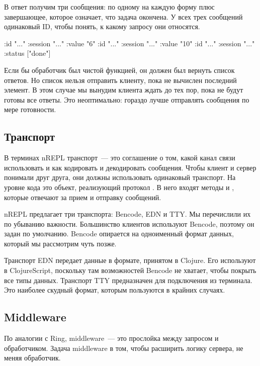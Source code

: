 В ответ получим три сообщения: по одному на каждую форму плюс завершающее, которое означает, что задача окончена. У всех трех сообщений одинаковый ID, чтобы понять, к какому запросу они относятся.

\begin{english}
  \begin{clojure}
{:id "..." :session "..." :value "6"}
{:id "..." :session "..." :value "10"}
{:id "..." :session "..." :status ["done"]}
  \end{clojure}
\end{english}

Если бы обработчик был чистой функцией, он должен был вернуть список ответов. Но список нельзя отправить клиенту, пока не вычислен последний элемент. В этом случае мы вынудим клиента ждать до тех пор, пока не будут готовы все ответы. Это неоптимально: гораздо лучше отправлять сообщения по мере готовности.

\subsection{Транспорт}

В терминах nREPL транспорт~--- это соглашение о том, какой канал связи использовать и как кодировать и декодировать сообщения. Чтобы клиент и сервер понимали друг друга, они должны использовать одинаковый транспорт. На уровне кода это объект, реализующий протокол . В него входят методы  и , которые отвечают за прием и отправку сообщений.

nREPL предлагает три транспорта: Bencode, EDN и TTY. Мы перечислили их по убыванию важности. Большинство клиентов используют Bencode, поэтому он задан по умолчанию. Bencode опирается на одноименный формат данных, который мы рассмотрим чуть позже.

Транспорт EDN передает данные в формате, принятом в Clojure. Его используют в ClojureScript, поскольку там возможностей Bencode не хватает, чтобы покрыть все типы данных. Транспорт TTY предназначен для подключения из терминала. Это наиболее скудный формат, которым пользуются в крайних случаях.

\subsection{Middleware}

По аналогии с Ring, middleware~--- это прослойка между запросом и обработчиком. Задача middleware в том, чтобы расширить логику сервера, не меняя обработчик.


